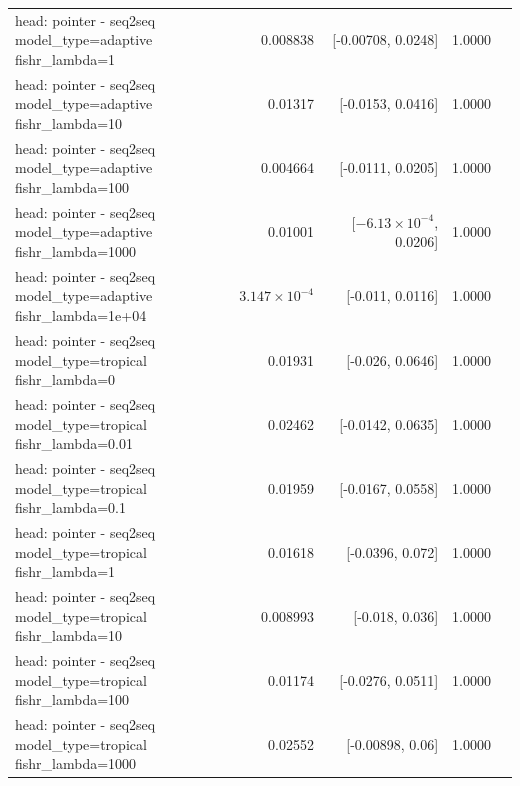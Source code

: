 \documentclass[10pt]{article}
\makeatletter
\newcommand{\stackcell}[1]{\begin{tabular}[t]{@{}l@{}}#1\end{tabular}}
\makeatother
\begin{document}
{\begin{longtable}{lrrrl}
\stackcell{head: pointer - seq2seq\\\footnotesize model\_type=adaptive fishr\_lambda=1 } & 0.008838 & [-0.00708, 0.0248] & 1.0000 & \\
\stackcell{head: pointer - seq2seq\\\footnotesize model\_type=adaptive fishr\_lambda=10 } & 0.01317 & [-0.0153, 0.0416] & 1.0000 & \\
\stackcell{head: pointer - seq2seq\\\footnotesize model\_type=adaptive fishr\_lambda=100 } & 0.004664 & [-0.0111, 0.0205] & 1.0000 & \\
\stackcell{head: pointer - seq2seq\\\footnotesize model\_type=adaptive fishr\_lambda=1000 } & 0.01001 & [$-6.13\times10^{-4}$, 0.0206] & 1.0000 & \\
\stackcell{head: pointer - seq2seq\\\footnotesize model\_type=adaptive fishr\_lambda=1e+04 } & $3.147\times10^{-4}$ & [-0.011, 0.0116] & 1.0000 & \\
\stackcell{head: pointer - seq2seq\\\footnotesize model\_type=tropical fishr\_lambda=0 } & 0.01931 & [-0.026, 0.0646] & 1.0000 & \\
\stackcell{head: pointer - seq2seq\\\footnotesize model\_type=tropical fishr\_lambda=0.01 } & 0.02462 & [-0.0142, 0.0635] & 1.0000 & \\
\stackcell{head: pointer - seq2seq\\\footnotesize model\_type=tropical fishr\_lambda=0.1 } & 0.01959 & [-0.0167, 0.0558] & 1.0000 & \\
\stackcell{head: pointer - seq2seq\\\footnotesize model\_type=tropical fishr\_lambda=1 } & 0.01618 & [-0.0396, 0.072] & 1.0000 & \\
\stackcell{head: pointer - seq2seq\\\footnotesize model\_type=tropical fishr\_lambda=10 } & 0.008993 & [-0.018, 0.036] & 1.0000 & \\
\stackcell{head: pointer - seq2seq\\\footnotesize model\_type=tropical fishr\_lambda=100 } & 0.01174 & [-0.0276, 0.0511] & 1.0000 & \\
\stackcell{head: pointer - seq2seq\\\footnotesize model\_type=tropical fishr\_lambda=1000 } & 0.02552 & [-0.00898, 0.06] & 1.0000 & \\

\end{longtable}}
\end{document}
